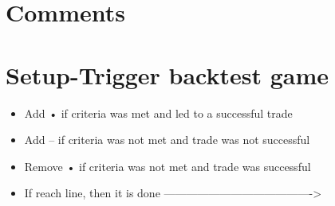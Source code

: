 \documentclass{../notes}
\begin{document}
\section{Comments}


\section{Setup-Trigger backtest game}
\begin{itemize}
  \item Add • if criteria was met and led to a successful trade
  \item Add -- if criteria was not met and trade was not successful
  \item Remove • if criteria was not met and trade was successful
  \item If reach line, then it is done ---------------------------------------->
\end{itemize}
\end{document}
